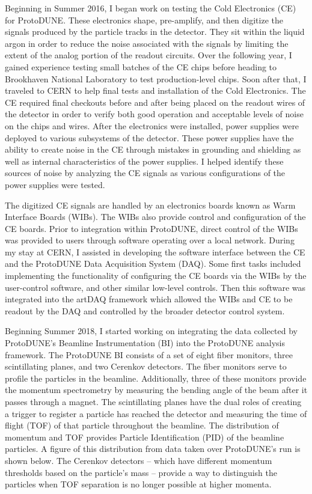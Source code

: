 \documentclass[12pt]{article}
\begin{document}
	Beginning in Summer 2016, I began work on testing the Cold Electronics (CE) for ProtoDUNE. These electronics shape, pre-amplify, and then digitize the signals produced by the particle tracks in the detector. They sit within the liquid argon in order to reduce the noise associated with the signals by limiting the extent of the analog portion of the readout circuits. Over the following year, I gained experience testing small batches of the CE chips before heading to Brookhaven National Laboratory to test production-level chips. Soon after that, I traveled to CERN to help final tests and installation of the Cold Electronics. The CE required final checkouts before and after being placed on the readout wires of the detector in order to verify both good operation and acceptable levels of noise on the chips and wires. After the electronics were installed, power supplies were deployed to various subsystems of the detector. These power supplies have the ability to create noise in the CE through mistakes in grounding and shielding as well as internal characteristics of the power supplies. I helped identify these sources of noise by analyzing the CE signals as various configurations of the power supplies were tested.
	
	The digitized CE signals are handled by an electronics boards known as Warm Interface Boards (WIBs). The WIBs also provide control and configuration of the CE boards. Prior to integration within ProtoDUNE, direct control of the WIBs was provided to users through software operating over a local network. During my stay at CERN, I assisted in developing the software interface between the CE and the ProtoDUNE Data Acquisition System (DAQ). Some first tasks included implementing the functionality of configuring the CE boards via the WIBs by the user-control software, and other similar low-level controls. Then this software was integrated into the artDAQ framework which allowed the WIBs and CE to be readout by the DAQ and controlled by the broader detector control system.
\\


	Beginning Summer 2018, I started working on integrating the data collected by ProtoDUNE’s Beamline Instrumentation (BI) into the ProtoDUNE analysis framework. The ProtoDUNE BI consists of a set of eight fiber monitors, three scintillating planes, and two Cerenkov detectors. The fiber monitors serve to profile the particles in the beamline. Additionally, three of these monitors provide the momentum spectrometry by measuring the bending angle of the beam after it passes through a magnet. The scintillating planes have the dual roles of creating a trigger to register a particle has reached the detector and measuring the time of flight (TOF) of that particle throughout the beamline. The distribution of momentum and TOF provides Particle Identification (PID) of the beamline particles. A figure of this distribution from data taken over ProtoDUNE’s run is shown below. The Cerenkov detectors – which have different momentum thresholds based on the particle’s mass  – provide a way to distinguish the particles when TOF separation is no longer possible at higher momenta.
\end{document}
